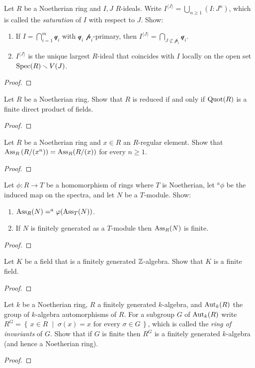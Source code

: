 \begin{problem}
Let $R$ be a Noetherian ring and $I,J$ $R$-ideals. Write
$I^{\langle  J \rangle}=\bigcup_{n\geq 1}(I:J^n)$, which is
called the \emph{saturation} of $I$ with respect to $J$. Show:
\begin{enumerate}[label=(\alph*)]
\item If $I=\bigcap_{i=1}^m\mathcal{q}_i$ with $\mathcal{q}_i$
  $\mathcal{p}_i$-primary, then $I^{\langle
    J\rangle}=\bigcap_{J\nsubset\mathcal{p}_i}\mathcal{q}_i$.
\item $I^{\langle  J \rangle}$ is the unique largest $R$-ideal
  that coincides with $I$ locally on the open set
  $\operatorname{Spec}(R)\smallsetminus V(J)$.
\end{enumerate}
\end{problem}
\begin{proof}
\end{proof}
\newpage
\begin{problem}
Let $R$ be a Noetherian ring. Show that $R$ is reduced if and
only if $\operatorname{Quot}(R)$ is a finite direct product of fields.
\end{problem}
\begin{proof}
\end{proof}
\newpage
\begin{problem}
Let $R$ be a Noetherian ring and $x\in R$ an $R$-regular
element. Show that $\operatorname{Ass}_R\left(R/(x^n)\right)=\operatorname{Ass}_R(R/(x))$ for
every $n\geq 1$.
\end{problem}
\begin{proof}
\end{proof}
\newpage
\begin{problem}
Let $\phi\colon R\to T$ be a homomorphism of rings where $T$ is
Noetherian, let $^a\phi$ be the induced map on the spectra, and
let $N$ be a $T$-module. Show:
\begin{enumerate}[label=(\alph*)]
\item $\operatorname{Ass}_R(N)=^a\varphi(\operatorname{Ass}_T(N))$.
\item If $N$ is finitely generated as a $T$-module then
  $\operatorname{Ass}_R(N)$ is finite.
\end{enumerate}
\end{problem}
\begin{proof}
\end{proof}
\newpage
\begin{problem}
Let $K$ be a field that is a finitely generated
$\mathbb{Z}$-algebra. Show that $K$ is a finite field.
\end{problem}
\begin{proof}
\end{proof}
\newpage
\begin{problem}
Let $k$ be a Noetherian ring, $R$ a finitely generated
$k$-algebra, and $\operatorname{Aut}_k(R)$ the group of $k$-algebra
automorphisms of $R$. For a subgroup $G$ of $\operatorname{Aut}_k(R)$ write
$R^G=\left\{\,x\in R\;\middle|\;\text{$\sigma(x)=x$ for every
    $\sigma\in G$}\,\right\}$, which is called the \emph{ring of
  invariants} of $G$. Show that if $G$ is finite then $R^G$ is a
finitely generated $k$-algebra (and hence a Noetherian ring).
\end{problem}
\begin{proof}
\end{proof}

